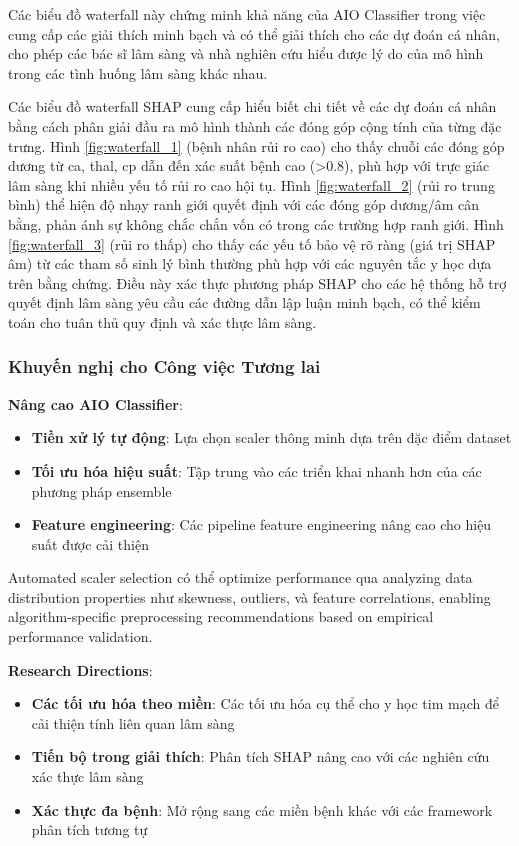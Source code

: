 Các biểu đồ waterfall này chứng minh khả năng của AIO Classifier trong việc cung cấp các giải thích minh bạch và có thể giải thích cho các dự đoán cá nhân, cho phép các bác sĩ lâm sàng và nhà nghiên cứu hiểu được lý do của mô hình trong các tình huống lâm sàng khác nhau.

Các biểu đồ waterfall SHAP cung cấp hiểu biết chi tiết về các dự đoán cá nhân bằng cách phân giải đầu ra mô hình thành các đóng góp cộng tính của từng đặc trưng. Hình \ref{fig:waterfall_1} (bệnh nhân rủi ro cao) cho thấy chuỗi các đóng góp dương từ ca, thal, cp dẫn đến xác suất bệnh cao (>0.8), phù hợp với trực giác lâm sàng khi nhiều yếu tố rủi ro cao hội tụ. Hình \ref{fig:waterfall_2} (rủi ro trung bình) thể hiện độ nhạy ranh giới quyết định với các đóng góp dương/âm cân bằng, phản ánh sự không chắc chắn vốn có trong các trường hợp ranh giới. Hình \ref{fig:waterfall_3} (rủi ro thấp) cho thấy các yếu tố bảo vệ rõ ràng (giá trị SHAP âm) từ các tham số sinh lý bình thường phù hợp với các nguyên tắc y học dựa trên bằng chứng. Điều này xác thực phương pháp SHAP cho các hệ thống hỗ trợ quyết định lâm sàng yêu cầu các đường dẫn lập luận minh bạch, có thể kiểm toán cho tuân thủ quy định và xác thực lâm sàng.

\subsubsection{Khuyến nghị cho Công việc Tương lai}

\textbf{Nâng cao AIO Classifier}:
\begin{itemize}
    \item \textbf{Tiền xử lý tự động}: Lựa chọn scaler thông minh dựa trên đặc điểm dataset
    \item \textbf{Tối ưu hóa hiệu suất}: Tập trung vào các triển khai nhanh hơn của các phương pháp ensemble
    \item \textbf{Feature engineering}: Các pipeline feature engineering nâng cao cho hiệu suất được cải thiện
\end{itemize}
Automated scaler selection có thể optimize performance qua analyzing data distribution properties như skewness, outliers, và feature correlations, enabling algorithm-specific preprocessing recommendations based on empirical performance validation.

\textbf{Research Directions}:
\begin{itemize}
    \item \textbf{Các tối ưu hóa theo miền}: Các tối ưu hóa cụ thể cho y học tim mạch để cải thiện tính liên quan lâm sàng
    \item \textbf{Tiến bộ trong giải thích}: Phân tích SHAP nâng cao với các nghiên cứu xác thực lâm sàng
    \item \textbf{Xác thực đa bệnh}: Mở rộng sang các miền bệnh khác với các framework phân tích tương tự
\end{itemize}

